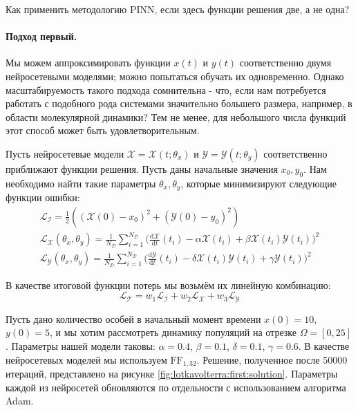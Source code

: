 \documentclass[a4paper, 12pt]{article}
\begin{document}
Как применить методологию PINN, если здесь функции решения две, а не одна?

\paragraph{Подход первый.} Мы можем аппроксимировать функции $x(t)$ и $y(t)$ соответственно двумя нейросетевыми моделями; можно попытаться обучать их одновременно. Однако масштабируемость такого подхода сомнительна - что, если нам потребуется работать с подобного рода системами значительно большего размера, например, в области молекулярной динамики? Тем не менее, для небольшого числа функций этот способ может быть удовлетворительным.

Пусть нейросетевые модели $\mathcal{X} = \mathcal{X}(t; \theta_x)$ и $\mathcal{Y} = \mathcal{Y}(t; \theta_y)$ соответственно приближают функции решения. Пусть даны начальные значения $x_0, y_0$. Нам необходимо найти такие параметры $\theta_x, \theta_y$, которые минимизируют следующие функции ошибки:
\begin{equation} \label{eq:lotkavolterra:losses}
\begin{gathered}
    \mathcal{L_I} = \frac{1}{2}((\mathcal{X}(0) - x_0)^2 + (\mathcal{Y}(0) - y_0)^2) \\
    \mathcal{L_X}(\theta_x, \theta_y) = \frac{1}{N_\mathcal{D}} \sum_{i=1}^{N_\mathcal{D}} \Big(\frac{\mathrm{d}\mathcal{X}}{\mathrm{d}t}(t_i)  - \alpha\mathcal{X}(t_i) + \beta\mathcal{X}(t_i)\mathcal{Y}(t_i)\Big)^2 \\
    \mathcal{L_Y}(\theta_x, \theta_y) = \frac{1}{N_\mathcal{D}} \sum_{i=1}^{N_\mathcal{D}} \Big(\frac{\mathrm{d}\mathcal{Y}}{\mathrm{d}t}(t_i) - \delta\mathcal{X}(t_i)\mathcal{Y}(t_i) + \gamma\mathcal{Y}(t_i)\Big)^2
\end{gathered}
\end{equation}

В качестве итоговой функции потерь мы возьмём их линейную комбинацию:
$$
\mathcal{L_T} = w_1\mathcal{L_I} + w_2\mathcal{L_X} + w_3\mathcal{L_Y}
$$

Пусть дано количество особей в начальный момент времени $x(0) = 10$, $y(0) = 5$, и мы хотим рассмотреть динамику популяций на отрезке $\Omega = [0, 25]$. Параметры нашей модели таковы: $\alpha = 0.4$, $\beta = 0.1$, $\delta = 0.1$, $\gamma = 0.6$. В качестве нейросетевых моделей мы используем $\mathrm{FF}_{1,32}$. Решение, полученное после 50000 итераций, представлено на рисунке \ref{fig:lotkavolterra:first:solution}. Параметры каждой из нейросетей обновляются по отдельности с использованием алгоритма Adam.
\end{document}
